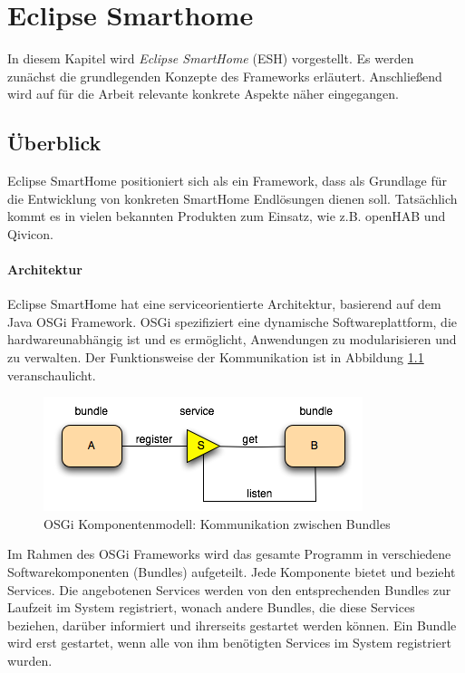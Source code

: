 \chapter{Eclipse Smarthome}
\label{chap:esh}
In diesem Kapitel wird \textit{Eclipse SmartHome} (ESH) \cite{ESH:home} vorgestellt. Es werden zunächst die grundlegenden Konzepte des Frameworks erläutert. Anschließend wird auf für die Arbeit relevante konkrete Aspekte näher eingegangen.

\section{Überblick}
Eclipse SmartHome positioniert sich als ein Framework, dass als Grundlage für die Entwicklung von konkreten SmartHome Endlösungen dienen soll. Tatsächlich kommt es in vielen bekannten Produkten zum Einsatz, wie z.B. openHAB und Qivicon.


\subsubsection{Architektur}
Eclipse SmartHome hat eine serviceorientierte Architektur, basierend auf dem Java OSGi Framework. OSGi spezifiziert eine dynamische Softwareplattform, die hardwareunabhängig ist und es ermöglicht, Anwendungen zu modularisieren und zu verwalten. Der Funktionsweise der Kommunikation ist in Abbildung \ref{fig:osgi} veranschaulicht.

\begin{figure}[h]
	\centering
	\includegraphics{bilder/osgi}
	\caption{OSGi Komponentenmodell: Kommunikation zwischen Bundles \cite{osgi:whatisit}}
	\label{fig:osgi}
\end{figure}

Im Rahmen des OSGi Frameworks wird das gesamte Programm in verschiedene Softwarekomponenten (Bundles) aufgeteilt. Jede Komponente bietet und bezieht Services. Die angebotenen Services werden von den entsprechenden Bundles zur Laufzeit im System registriert, wonach andere Bundles, die diese Services beziehen, darüber informiert und ihrerseits gestartet werden können. Ein Bundle wird erst gestartet, wenn alle von ihm benötigten Services im System registriert wurden.\\


